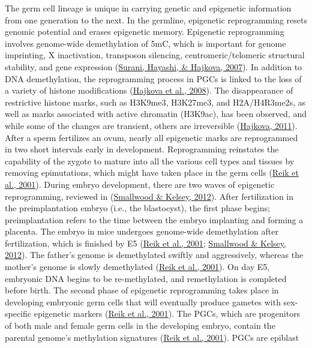 \documentclass[12pt,twoside]{reedthesis}
\begin{document}
The germ cell lineage is unique in carrying genetic and epigenetic
information from one generation to the next. In the germline, epigenetic
reprogramming resets genomic potential and erases epigenetic memory.
Epigenetic reprogramming involves genome-wide demethylation of 5mC,
which is important for genome imprinting, X inactivation, transposon
silencing, centromeric/telomeric structural stability, and gene
expression (\protect\hyperlink{ref-surani2007}{Surani, Hayashi, \& Hajkova, 2007}). In addition to DNA demethylation, the
reprogramming process in PGCs is linked to the loss of a variety of
histone modifications (\protect\hyperlink{ref-hajkova2008}{Hajkova et al., 2008}). The disappearance of restrictive
histone marks, such as H3K9me3, H3K27me3, and H2A/H4R3me2s, as well as
marks associated with active chromatin (H3K9ac), has been observed, and
while some of the changes are transient, others are irreversible
(\protect\hyperlink{ref-hajkova2011}{Hajkova, 2011}). After a sperm fertilizes an ovum, nearly all epigenetic
marks are reprogrammed in two short intervals early in development.
Reprogramming reinstates the capability of the zygote to mature into all
the various cell types and tissues by removing epimutations, which might
have taken place in the germ cells (\protect\hyperlink{ref-reik2001}{Reik et al., 2001}). During embryo
development, there are two waves of epigenetic reprogramming, reviewed
in (\protect\hyperlink{ref-smallwood2012}{Smallwood \& Kelsey, 2012}). After fertilization in the preimplantation embryo
(i.e., the blastocyst), the first phase begins; preimplantation refers
to the time between the embryo implanting and forming a placenta. The
embryo in mice undergoes genome-wide demethylation after fertilization,
which is finished by E5 (\protect\hyperlink{ref-reik2001}{Reik et al., 2001}; \protect\hyperlink{ref-smallwood2012}{Smallwood \& Kelsey, 2012}). The father's genome
is demethylated swiftly and aggressively, whereas the mother's genome is
slowly demethylated (\protect\hyperlink{ref-reik2001}{Reik et al., 2001}). On day E5, embryonic DNA begins to be
re-methylated, and remethylation is completed before birth. The second
phase of epigenetic reprogramming takes place in developing embryonic
germ cells that will eventually produce gametes with sex-specific
epigenetic markers (\protect\hyperlink{ref-reik2001}{Reik et al., 2001}). The PGCs, which are progenitors of both
male and female germ cells in the developing embryo, contain the
parental genome's methylation signatures (\protect\hyperlink{ref-reik2001}{Reik et al., 2001}). PGCs are epiblast
\end{document}
